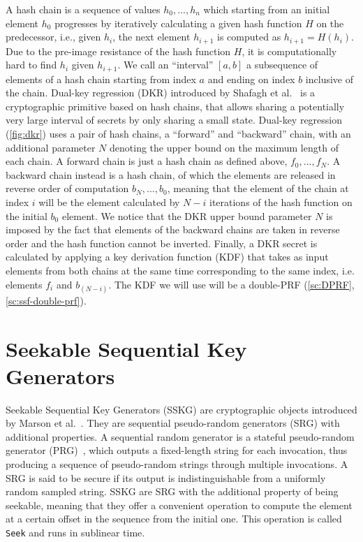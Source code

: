 A hash chain is a sequence of values
$h_{0}, ..., h_{n}$ which starting from an initial
element $h_0$ progresses by iteratively calculating
a given hash function $H$ on the predecessor,
i.e., given $h_i$, the next element $h_{i+1}$ is computed as $h_{i+1} = H(h_i)$.
Due to the pre-image resistance of the hash function $H$, 
it is computationally hard to find $h_i$ given $h_{i+1}$.
We call an ``interval'' $[a, b]$ a subsequence of elements
of a hash chain starting from index $a$ and ending
on index $b$ inclusive of the chain.
Dual-key regression (DKR) introduced by Shafagh et al.~\cite{USENIX:SBRH20} is a
cryptographic primitive based on hash chains, that
allows sharing a potentially very large interval 
of secrets by only sharing a small state.
Dual-key regression (\cref{fig:dkr}) uses a pair of hash chains,
a ``forward'' and ``backward'' chain, with an additional
parameter $N$ denoting the
upper bound on the maximum length of each chain.
A forward chain is just a hash chain as defined
above, $f_{0}, ..., f_{N}$.
A backward chain instead is a hash chain, of which the
elements are released in reverse order of computation
$b_{N}, ..., b_{0}$, meaning that the element of the chain 
at index $i$ will be the element calculated by $N - i$
iterations of the hash function on the initial $b_{0}$
element. We notice that the DKR upper bound parameter
$N$ is imposed by the fact that elements of the backward chains are taken in
reverse order and the hash function cannot be inverted.
Finally, a DKR secret is calculated by applying
a key derivation function (KDF) that takes as input elements from both chains at the same time corresponding to the same index, i.e.\!
elements $f_{i}$ and $b_{(N - i)}$.
The KDF we will use will be a double-PRF (\cref{sc:DPRF}, \cref{sc:ssf-double-prf}).


\section{Seekable Sequential Key Generators}\label{sc:SSKG}

Seekable Sequential Key Generators (SSKG) are cryptographic objects introduced by Marson et al.~\cite{ESORICS:MarPoe13}.
They are sequential pseudo-random generators (SRG) with additional properties.
A sequential random generator is a stateful pseudo-random generator (PRG)~\cite{cryptoeprint:2017/208}, 
which outputs a fixed-length string for each invocation, 
thus producing a sequence of pseudo-random strings through multiple invocations.
A SRG is said to be secure if its output is indistinguishable from a uniformly random sampled string.
SSKG are SRG with the additional property of being seekable,
meaning that they offer a convenient operation to compute the
element at a certain offset in the sequence from the initial one.
This operation is called \texttt{Seek} and runs in sublinear time.

